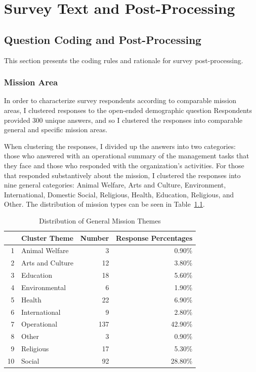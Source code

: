 \chapter{Survey Text and Post-Processing}
\label{surveyappendix}

\section{Question Coding and Post-Processing}

This section presents the coding rules and rationale for survey post-processing.

\subsection{Mission Area}

In order to characterize survey respondents according to comparable mission areas, I clustered responses to the open-ended demographic question   Respondents provided 300 unique answers, and so I clustered the responses into comparable general and specific mission areas.

When clustering the responses, I divided up the answers into two categories: those who answered with an operational summary of the management tasks that they face and those who responded with the organization's activities.  For those that responded substantively about the mission, I clustered the responses into nine general categories: Animal Welfare, Arts and Culture, Environment, International, Domestic Social, Religious, Health, Education, Religious, and Other.  The distribution of mission types can be seen in Table~\ref{tab:clusterprops}. 
 \begin{table}[ht]
 \centering
 \begin{tabular}{rlrr}
   \hline
  & Cluster Theme & Number & Response Percentages \\
   \hline
 1 & Animal Welfare &   3 & 0.90\% \\
   2 & Arts and Culture &  12 & 3.80\% \\
   3 & Education &  18 & 5.60\%\\
   4 & Environmental &   6 & 1.90\% \\
   5 & Health &  22 & 6.90\% \\
   6 & International &   9 & 2.80\% \\
   7 & Operational & 137 & 42.90\% \\
   8 & Other &   3 & 0.90\% \\
   9 & Religious &  17 & 5.30\% \\
   10 & Social &  92 & 28.80\% \\
    \hline
 \end{tabular}
\caption{Distribution of General Mission Themes}
\label{tab:clusterprops}
 \end{table}
 

